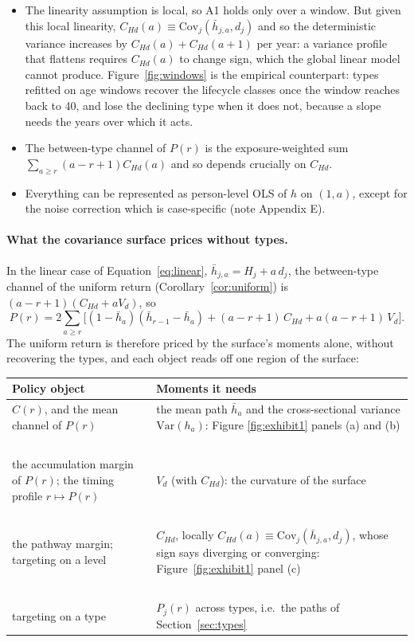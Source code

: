 \documentclass[11pt]{article}
\newcommand{\Var}{\mathrm{Var}}
\newcommand{\Cov}{\mathrm{Cov}}
\begin{document}
	\begin{itemize}
		\item The linearity assumption is local, so A1 holds only over a window. But given this local linearity, $C_{Hd}(a)\equiv\Cov_j(\bar h_{j,a},d_j)$ and so the deterministic variance increases by $C_{Hd}(a)+C_{Hd}(a+1)$ per year: a variance profile that flattens requires $C_{Hd}(a)$ to change sign, which the global linear model cannot produce. Figure~\ref{fig:windows} is the empirical counterpart: types refitted on age windows recover the lifecycle classes once the window reaches back to 40, and lose the declining type when it does not, because a slope needs the years over which it acts. 
		\item The between-type channel of $P(r)$ is the exposure-weighted sum $\sum_{a\ge r}(a-r+1)C_{Hd}(a)$ and so depends crucially on $C_{Hd}$.
		\item Everything can be represented as person-level OLS of $h$ on $(1,a)$, except for the noise correction which is case-specific (note Appendix E).
	\end{itemize}

	\paragraph{What the covariance surface prices without types.}
	In the linear case of Equation~\ref{eq:linear}, $\bar h_{j,a}=H_j+a\,d_j$, the between-type channel of the uniform return (Corollary~\ref{cor:uniform}) is $(a-r+1)(C_{Hd}+aV_d)$, so
	\begin{equation}
		P(r)=2\sum_{a\ge r}\bigl[(1-\bar h_a)(\bar h_{r-1}-\bar h_a)+ (a-r+1)\,C_{Hd} + a(a-r+1)\,V_d\bigr].
		\label{eq:Pr}
	\end{equation}
	The uniform return is therefore priced by the surface's moments alone, without recovering the types, and each object reads off one region of the surface:

	\begin{center}\small
		\begin{tabular}{@{}p{5.6cm}p{6.4cm}@{}}
			\toprule
			Policy object & Moments it needs \\
			\midrule
			$C(r)$, and the mean channel of $P(r)$ & the mean path $\bar h_a$ and the cross-sectional
			variance $\Var(h_a)$: Figure \ref{fig:exhibit1} panels (a) and (b)
			\\~\\
			the accumulation margin of $P(r)$; the timing profile $r\mapsto P(r)$ & $V_d$ (with
			$C_{Hd}$): the curvature of the surface
			\\~\\
			the pathway margin; targeting on a level & $C_{Hd}$, locally $C_{Hd}(a)\equiv
			\Cov_j(\bar h_{j,a},d_j)$, whose sign says diverging or converging: Figure~\ref{fig:exhibit1} panel (c)
			\\~\\
			targeting on a type & $P_j(r)$ across types, i.e.\ the paths of Section~\ref{sec:types} \\
			\bottomrule
		\end{tabular}
	\end{center}
\end{document}
